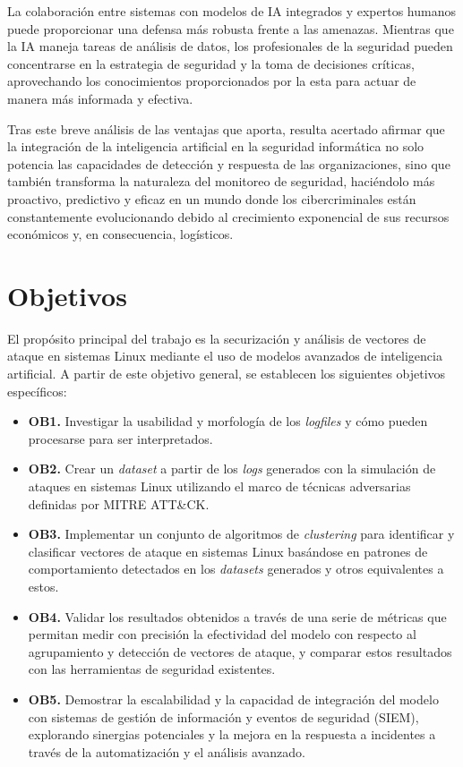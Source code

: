 La colaboración entre sistemas con modelos de \gls{IA} integrados y expertos humanos puede proporcionar una defensa más robusta frente a las amenazas. Mientras que la IA maneja tareas de análisis de datos, los profesionales de la seguridad pueden concentrarse en la estrategia de seguridad y la toma de decisiones críticas, aprovechando los conocimientos proporcionados por la esta para actuar de manera más informada y efectiva.

Tras este breve análisis de las ventajas que aporta, resulta acertado afirmar que la integración de la inteligencia artificial en la seguridad informática no solo potencia las capacidades de detección y respuesta de las organizaciones, sino que también transforma la naturaleza del monitoreo de seguridad, haciéndolo más proactivo, predictivo y eficaz en un mundo donde los cibercriminales están constantemente evolucionando debido al crecimiento exponencial de sus recursos económicos y, en consecuencia, logísticos.

\newpage


\section{Objetivos}


El propósito principal del trabajo es la securización y análisis de vectores de ataque en sistemas Linux mediante el uso de modelos avanzados de inteligencia artificial. A partir de este objetivo general, se establecen los siguientes objetivos específicos:

\begin{itemize} \label{item:objetivos}

    \item \textbf{OB1.} Investigar la usabilidad y morfología de los \textit{logfiles} y cómo pueden procesarse para ser interpretados.
    \item \textbf{OB2.} Crear un \textit{dataset} a partir de los \textit{logs} generados con la simulación de ataques en sistemas Linux utilizando el marco de técnicas adversarias definidas por MITRE ATT\&CK.
    \item \textbf{OB3.} Implementar un conjunto de algoritmos de \textit{clustering} para identificar y clasificar vectores de ataque en sistemas Linux basándose en patrones de comportamiento detectados en los \textit{datasets} generados y otros equivalentes a estos.
    \item \textbf{OB4.} Validar los resultados obtenidos a través de una serie de métricas que permitan medir con precisión la efectividad del modelo con respecto al agrupamiento y detección de vectores de ataque, y comparar estos resultados con las herramientas de seguridad existentes.
    \item \textbf{OB5.} Demostrar la escalabilidad y la capacidad de integración del modelo con sistemas de gestión de información y eventos de seguridad (SIEM), explorando sinergias potenciales y la mejora en la respuesta a incidentes a través de la automatización y el análisis avanzado.
\end{itemize}

